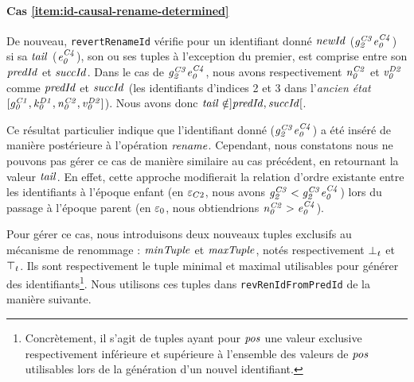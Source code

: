 \paragraph{Cas \ref{item:id-causal-rename-determined}}

De nouveau, \texttt{revertRenameId} vérifie pour un identifiant donné $\mathit{newId}$ (\eg $\mathit{g}^{\mathit{C3}}_{\mathit{2}}\mathit{e}^{\mathit{C4}}_{\mathit{0}}$) si sa $\mathit{tail}$ ($\mathit{e}^{\mathit{C4}}_{\mathit{0}}$), \ie son ou ses tuples à l'exception du premier, est comprise entre son $\mathit{predId}$ et $\mathit{succId}$.
Dans le cas de $\mathit{g}^{\mathit{C3}}_{\mathit{2}}\mathit{e}^{\mathit{C4}}_{\mathit{0}}$, nous avons respectivement $\mathit{n}^{\mathit{C2}}_{\mathit{0}}$ et $\mathit{v}^{\mathit{D2}}_{\mathit{0}}$ comme $\mathit{predId}$ et $\mathit{succId}$ (les identifiants d'indices 2 et 3 dans l'\emph{ancien état} $[\mathit{g}^{\mathit{C1}}_{\mathit{0}},\mathit{k}^{\mathit{D1}}_{\mathit{0}},\mathit{n}^{\mathit{C2}}_{\mathit{0}},\mathit{v}^{\mathit{D2}}_{\mathit{0}}]$).
Nous avons donc $\mathit{tail} \notin ]\mathit{predId},\mathit{succId}[$.

Ce résultat particulier indique que l'identifiant donné (\eg $\mathit{g}^{\mathit{C3}}_{\mathit{2}}\mathit{e}^{\mathit{C4}}_{\mathit{0}}$) a été inséré de manière postérieure à l'opération $\mathit{rename}$.
Cependant, nous constatons nous ne pouvons pas gérer ce cas de manière similaire au cas précédent, \ie en retournant la valeur $\mathit{tail}$.
En effet, cette approche modifierait la relation d'ordre existante entre les identifiants à l'époque enfant (en $\varepsilon_{C2}$, nous avons $\mathit{g}^{\mathit{C3}}_{\mathit{2}} < \mathit{g}^{\mathit{C3}}_{\mathit{2}}\mathit{e}^{\mathit{C4}}_{\mathit{0}}$) lors du passage à l'époque parent (en $\varepsilon_{0}$, nous obtiendrions $\mathit{n}^{\mathit{C2}}_{\mathit{0}} > \mathit{e}^{\mathit{C4}}_{\mathit{0}}$).

Pour gérer ce cas, nous introduisons deux nouveaux tuples exclusifs au mécanisme de renommage : $\mathit{minTuple}$ et $\mathit{maxTuple}$, notés respectivement $\bot_t$ et $\top_t$.
Ils sont respectivement le tuple minimal et maximal utilisables pour générer des identifiants\footnote{Concrètement, il s'agit de tuples ayant pour $\mathit{pos}$ une valeur exclusive respectivement inférieure et supérieure à l'ensemble des valeurs de $\mathit{pos}$ utilisables lors de la génération d'un nouvel identifiant.}.
Nous utilisons ces tuples dans \texttt{revRenIdFromPredId} de la manière suivante.

